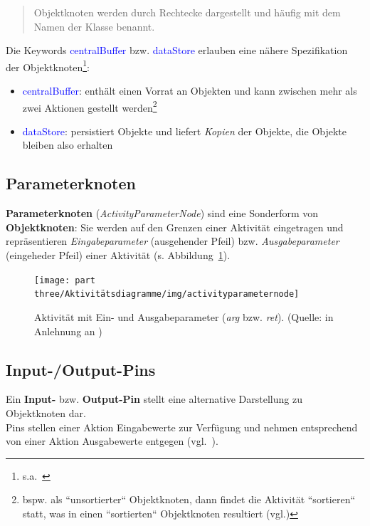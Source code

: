 \blockquote[{\cite[73]{Bal05}}]{
    Objektknoten werden durch Rechtecke dargestellt und häufig mit dem Namen der Klasse benannt.
}

\noindent
Die Keywords \textcolor{blue}{\guillemotleft centralBuffer\guillemotright} bzw. \textcolor{blue}{\guillemotleft dataStore\guillemotright} erlauben eine nähere Spezifikation der Objektknoten\footnote{s.a.~\cite[398 f.]{OMG17}}:

\begin{itemize}
    \item \textcolor{blue}{\guillemotleft centralBuffer\guillemotright}: enthält einen Vorrat an Objekten und kann zwischen mehr als zwei Aktionen gestellt werden\footnote{
    bspw. als ``unsortierter`` Objektknoten, dann findet die Aktivität ``sortieren`` statt, was in einen ``sortierten`` Objektknoten resultiert (vgl.\cite[Abb. 6.6, 62]{Buh09})
    }
    \item \textcolor{blue}{\guillemotleft dataStore\guillemotright}: persistiert Objekte und liefert \textit{Kopien} der Objekte, die Objekte bleiben also erhalten
\end{itemize}


\subsection{Parameterknoten}
\textbf{Parameterknoten} (\textit{ActivityParameterNode}) sind eine Sonderform von \textbf{Objektknoten}: Sie werden auf den Grenzen einer Aktivität eingetragen und repräsentieren \textit{Eingabeparameter} (ausgehender Pfeil) bzw. \textit{Ausgabeparameter} (eingeheder Pfeil) einer Aktivität (s. Abbildung~\ref{fig:activityparameternode}).




\begin{figure}
    \centering
    \texttt{[image: part three/Aktivitätsdiagramme/img/activityparameternode]}
    \caption{Aktivität  mit Ein- und Ausgabeparameter (\textit{arg} bzw. \textit{ret}). (Quelle: in Anlehnung an \cite[Abb.2.9-2, 70]{Bal05})}
    \label{fig:activityparameternode}
\end{figure}


\subsection{Input-/Output-Pins}
Ein \textbf{Input-} bzw. \textbf{Output-Pin} stellt eine alternative Darstellung zu Objektknoten dar.\\
Pins stellen einer Aktion Eingabewerte zur Verfügung und nehmen entsprechend von einer Aktion Ausgabewerte entgegen (vgl.~\cite[73 f.]{Bal05}).


